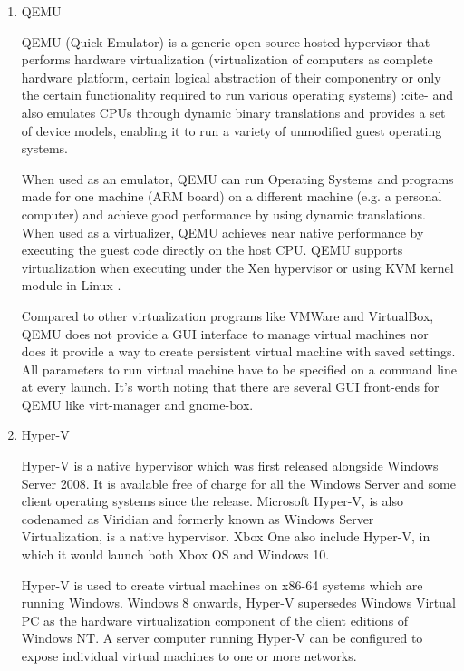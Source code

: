 \begin{enumerate}
\item {} 
QEMU

QEMU (Quick Emulator) is a generic open source hosted hypervisor
\label{\detokenize{i524/technologies:id624}}{\hyperref[\detokenize{i524/technologies:www-hypervisor}]{\sphinxcrossref{{[}539{]}}}} that performs hardware virtualization
(virtualization of computers as complete hardware platform,
certain logical abstraction of their componentry or only the
certain functionality required to run various operating systems)
:cite- and also emulates CPUs through dynamic binary
translations and provides a set of device models, enabling it to
run a variety of unmodified guest operating systems.

When used as an emulator, QEMU can run Operating Systems and
programs made for one machine (ARM board) on a different machine
(e.g. a personal computer) and achieve good performance by using
dynamic translations.  When used as a virtualizer, QEMU achieves
near native performance by executing the guest code directly on
the host CPU. QEMU supports virtualization when executing under
the Xen hypervisor or using KVM kernel module in Linux
\label{\detokenize{i524/technologies:id625}}{\hyperref[\detokenize{i524/technologies:www-qemuwiki}]{\sphinxcrossref{{[}540{]}}}}.

Compared to other virtualization programs like VMWare and VirtualBox,
QEMU does not provide a GUI interface to manage virtual machines nor
does it provide a way to create persistent virtual machine with saved
settings. All parameters to run virtual machine have to be specified
on a command line at every launch. It’s worth noting that there are
several GUI front-ends for QEMU like virt-manager and gnome-box.

\item {} 
Hyper-V

Hyper-V is a native hypervisor which was first released alongside
Windows Server 2008. It is available free of charge for all the
Windows Server and some client operating systems since the
release. Microsoft Hyper-V, is also codenamed as Viridian and
formerly known as Windows Server Virtualization, is a native
hypervisor. Xbox One also include Hyper-V, in which it would
launch both Xbox OS and Windows 10. \label{\detokenize{i524/technologies:id626}}{\hyperref[\detokenize{i524/technologies:www-hyper-v-wikipedia}]{\sphinxcrossref{{[}541{]}}}}

Hyper-V is used to create virtual machines on x86-64 systems
which are running Windows. Windows 8 onwards, Hyper-V supersedes
Windows Virtual PC as the hardware virtualization component of
the client editions of Windows NT. A server computer running
Hyper-V can be configured to expose individual virtual machines
to one or more networks.


\end{enumerate}

